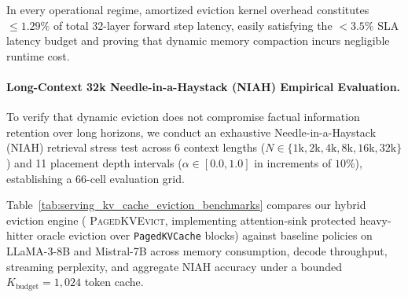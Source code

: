 In every operational regime, amortized eviction kernel overhead constitutes $\le 1.29\%$ of total 32-layer forward step latency, easily satisfying the $< 3.5\%$ SLA latency budget and proving that dynamic memory compaction incurs negligible runtime cost.

\paragraph{Long-Context 32k Needle-in-a-Haystack (NIAH) Empirical Evaluation.}
To verify that dynamic eviction does not compromise factual information retention over long horizons, we conduct an exhaustive Needle-in-a-Haystack (NIAH) retrieval stress test across 6 context lengths ($N \in \{1\text{k}, 2\text{k}, 4\text{k}, 8\text{k}, 16\text{k}, 32\text{k}\}$) and 11 placement depth intervals ($\alpha \in [0.0, 1.0]$ in increments of $10\%$), establishing a 66-cell evaluation grid.

Table~\ref{tab:serving_kv_cache_eviction_benchmarks} compares our hybrid eviction engine (\textsc{\neuralops{} PagedKVEvict}, implementing attention-sink protected heavy-hitter oracle eviction over \texttt{PagedKVCache} blocks) against baseline policies on LLaMA-3-8B and Mistral-7B across memory consumption, decode throughput, streaming perplexity, and aggregate NIAH accuracy under a bounded $K_{\text{budget}} = 1{,}024$ token cache.


